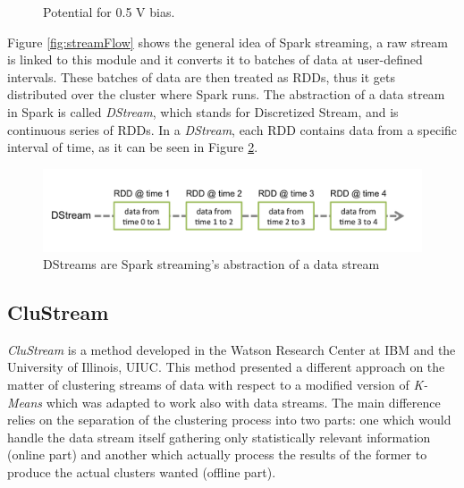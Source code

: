 
\begin{figure}
\centering
\caption{Potential for 0.5 V bias.} 
\label{fig:EcUND} 
\end{figure} 


Figure \ref{fig:streamFlow} shows the general idea of Spark streaming\cite{sparkStreaming}, a raw stream is linked to this module and it converts it to batches of data at user-defined intervals. These batches of data are then treated as RDDs, thus it gets distributed over the cluster where Spark runs. The abstraction of a data stream in Spark is called \textit{DStream}, which stands for Discretized Stream, and is continuous series of RDDs. In a \textit{DStream}, each RDD contains data from a specific interval of time, as it can be seen in Figure \ref{fig:dstream}.


\begin{figure}[h!]
 \centering
 \includegraphics[scale=0.6]{./styles/streaming-dstream.png}
 \caption{DStreams are Spark streaming's abstraction of a data stream}
 \label{fig:dstream}
\end{figure}

\subsection{CluStream}

\textit{CluStream} is a method developed in the Watson Research Center at IBM and the University of Illinois, UIUC. This method presented a different approach on the matter of clustering streams of data with respect to a modified version of \textit{K-Means} which was adapted to work also with data streams. The main difference relies on the separation of the clustering process into two parts: one which would handle the data stream itself gathering only statistically relevant information (online part) and another which actually process the results of the former to produce the actual clusters wanted (offline part). 

